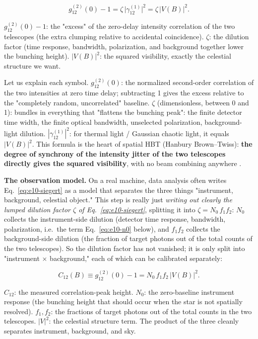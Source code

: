 \begin{equation}
  g_{12}^{(2)}(0)-1=\zeta\,\big|\gamma_{12}^{(1)}\big|^2=\zeta\,\big|V(B)\big|^2 .
  \label{eq:e10-siegert}
\end{equation}
\begin{formulaexplain}
\(g_{12}^{(2)}(0)-1\): the "excess" of the zero-delay intensity correlation of the two telescopes (the extra clumping relative to accidental coincidence). \(\zeta\): the dilution factor (time response, bandwidth, polarization, and background together lower the bunching height). \(|V(B)|^2\): the squared visibility, exactly the celestial structure we want.
\end{formulaexplain}

Let us explain each symbol. \(g_{12}^{(2)}(0)\): the normalized second-order correlation of the two intensities at zero time delay; subtracting 1 gives the excess relative to the "completely random, uncorrelated" baseline. \(\zeta\) (dimensionless, between 0 and 1): bundles in everything that "flattens the bunching peak": the finite detector time width, the finite optical bandwidth, unselected polarization, background-light dilution. \(|\gamma_{12}^{(1)}|^2\): for thermal light / Gaussian chaotic light, it equals \(|V(B)|^2\). This formula is the heart of spatial HBT (Hanbury Brown--Twiss): \textbf{the degree of synchrony of the intensity jitter of the two telescopes directly gives the squared visibility}, with no beam combining anywhere \citep{1956Natur.177...27B}.

\textbf{The observation model.} On a real machine, data analysis often writes Eq.~\eqref{eq:e10-siegert} as a model that separates the three things "instrument, background, celestial object." This step is really just \emph{writing out clearly the lumped dilution factor \(\zeta\) of Eq.~\eqref{eq:e10-siegert}}, splitting it into \(\zeta=N_0\,f_1 f_2\): \(N_0\) collects the instrument-side dilution (detector time response, bandwidth, polarization, i.e.\ the term Eq.~\eqref{eq:e10-n0} below), and \(f_1 f_2\) collects the background-side dilution (the fraction of target photons out of the total counts of the two telescopes). So the dilution factor has not vanished; it is only split into "instrument \(\times\) background," each of which can be calibrated separately:

\begin{equation}
  C_{12}(B)\equiv g_{12}^{(2)}(0)-1=N_0\,f_1 f_2\,\big|V(B)\big|^2 .
  \label{eq:e10-model}
\end{equation}
\begin{formulaexplain}
\(C_{12}\): the measured correlation-peak height. \(N_0\): the zero-baseline instrument response (the bunching height that should occur when the star is not spatially resolved). \(f_1,f_2\): the fractions of target photons out of the total counts in the two telescopes. \(|V|^2\): the celestial structure term. The product of the three cleanly separates instrument, background, and sky.
\end{formulaexplain}

